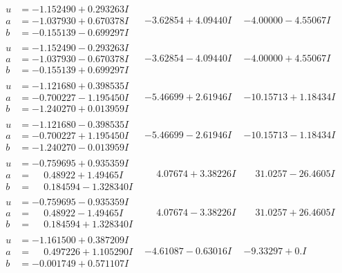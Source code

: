 \documentclass[1p]{elsarticle_modified}
\theoremstyle{definition}
\begin{document}
$$\begin{array}{c|c|c}
\begin{aligned}
u &= -1.152490 + 0.293263 I \\
a &= -1.037930 + 0.670378 I \\
b &= -0.155139 - 0.699297 I\end{aligned}
 & -3.62854 + 4.09440 I & -4.00000 - 4.55067 I \\ \hline\begin{aligned}
u &= -1.152490 - 0.293263 I \\
a &= -1.037930 - 0.670378 I \\
b &= -0.155139 + 0.699297 I\end{aligned}
 & -3.62854 - 4.09440 I & -4.00000 + 4.55067 I \\ \hline\begin{aligned}
u &= -1.121680 + 0.398535 I \\
a &= -0.700227 - 1.195450 I \\
b &= -1.240270 + 0.013959 I\end{aligned}
 & -5.46699 + 2.61946 I & -10.15713 + 1.18434 I \\ \hline\begin{aligned}
u &= -1.121680 - 0.398535 I \\
a &= -0.700227 + 1.195450 I \\
b &= -1.240270 - 0.013959 I\end{aligned}
 & -5.46699 - 2.61946 I & -10.15713 - 1.18434 I \\ \hline\begin{aligned}
u &= -0.759695 + 0.935359 I \\
a &= \phantom{-}0.48922 + 1.49465 I \\
b &= \phantom{-}0.184594 - 1.328340 I\end{aligned}
 & \phantom{-}4.07674 + 3.38226 I & \phantom{-}31.0257 - 26.4605 I \\ \hline\begin{aligned}
u &= -0.759695 - 0.935359 I \\
a &= \phantom{-}0.48922 - 1.49465 I \\
b &= \phantom{-}0.184594 + 1.328340 I\end{aligned}
 & \phantom{-}4.07674 - 3.38226 I & \phantom{-}31.0257 + 26.4605 I \\ \hline\begin{aligned}
u &= -1.161500 + 0.387209 I \\
a &= \phantom{-}0.497226 + 1.105290 I \\
b &= -0.001749 + 0.571107 I\end{aligned}
 & -4.61087 - 0.63016 I & -9.33297 + 0. I\phantom{ +0.000000I} \\ \hline\begin{aligned}

\end{aligned}
\end{array}$$
\end{document}
